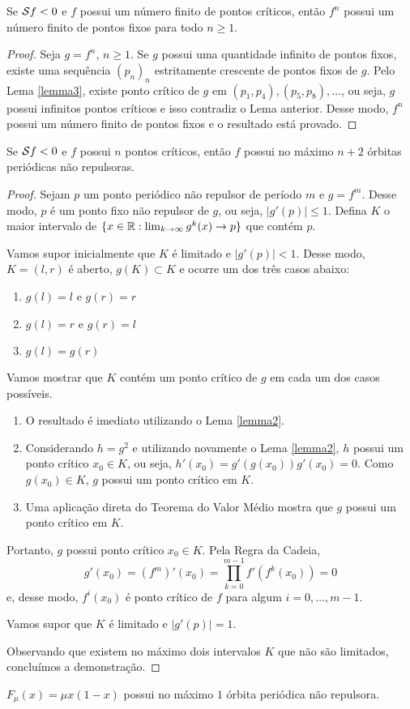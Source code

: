 \begin{lemma}
Se $\mathcal{S} f < 0$ e $f$ possui um número finito de pontos críticos, então $f^n$ possui um número finito de pontos fixos para todo $n \geq 1$.
\end{lemma}
\begin{proof}
Seja $g = f^n$, $n \geq 1$. Se $g$ possui uma quantidade infinito de pontos fixos, existe uma sequência $(p_n)_n$ estritamente crescente de pontos fixos de $g$. Pelo Lema \ref{lemma3}, existe ponto crítico de $g$ em $(p_1, p_4), (p_5, p_8), \dots$, ou seja, $g$ possui infinitos pontos críticos e isso contradiz o Lema anterior. Desse modo, $f^n$ possui um número finito de pontos fixos e o resultado está provado.
\end{proof}

\begin{theorem}[Singer]
Se $\mathcal{S} f < 0$ e $f$ possui $n$ pontos críticos, então $f$ possui no máximo $n+2$ órbitas periódicas não repulsoras.
\end{theorem}

\begin{proof}
Sejam $p$ um ponto periódico não repulsor de período $m$ e $g = f^m$. Desse modo, $p$ é um ponto fixo não repulsor de $g$, ou seja, $|g'(p)| \leq 1$. Defina $K$ o maior intervalo de $\{ x \in \mathbb{R} : \lim_{k \to \infty} g^k(x) \to p \}$ que contém $p$. 

Vamos supor inicialmente que $K$ é limitado e $|g'(p)| < 1$. Desse modo, $K=(l,r)$ é aberto, $g(K) \subset K$ e ocorre um dos três casos abaixo:
\begin{enumerate}[label=(\alph*)]
\item $g(l) = l$ e $g(r) = r$
\item $g(l) = r$ e $g(r) = l$
\item $g(l) = g(r)$
\end{enumerate}


Vamos mostrar que $K$ contém um ponto crítico de $g$ em cada um dos casos possíveis.
\begin{enumerate}[label=(\alph*)]
\item O resultado é imediato utilizando o Lema \ref{lemma2}.
\item Considerando $h = g^2$ e utilizando novamente o Lema \ref{lemma2}, $h$ possui um ponto crítico $x_0 \in K$, ou seja, $h'(x_0) = g'(g(x_0))g'(x_0) = 0$. Como $g(x_0) \in K$, $g$ possui um ponto crítico em $K$.
\item Uma aplicação direta do Teorema do Valor Médio mostra que $g$ possui um ponto crítico em $K$.\end{enumerate}

Portanto, $g$ possui ponto crítico $x_0 \in K$. Pela Regra da Cadeia,
$$g'(x_0) = (f^m)'(x_0) = \prod_{k=0}^{m-1} f'(f^k(x_0)) = 0$$
e, desse modo, $f^i(x_0)$ é ponto crítico de $f$ para algum $i = 0, \dots, m-1$.

Vamos supor que $K$ é limitado e $|g'(p)| = 1$.

Observando que existem no máximo dois intervalos $K$ que não são limitados, concluímos a demonstração.
\end{proof}

\begin{corollary}
$F_\mu(x) = \mu x(1-x)$ possui no máximo $1$ órbita periódica não repulsora.
\end{corollary}
